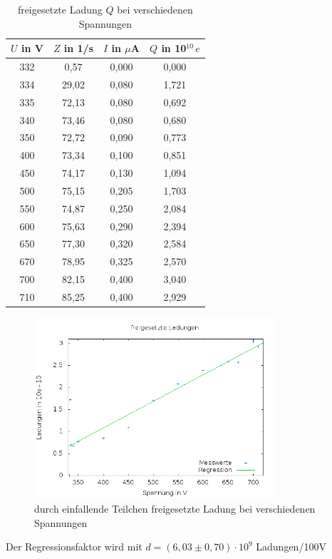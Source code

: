 \begin{table}[H]
\begin{tabular}{c|c|c|c}
$U$ in V & $Z$ in 1/s & $I$ in $\mu$A & $Q$ in 10$^{10}\,e$\\
\hline
332	&0,57&	0,000&	0,000\\
334&	29,02&	0,080&	1,721\\
335&	72,13&	0,080&	0,692\\
340&	73,46&	0,080&	0,680\\
350&	72,72&	0,090&	0,773\\
400&	73,34&	0,100&	0,851\\
450&	74,17&	0,130&	1,094\\
500&	75,15&	0,205&	1,703\\
550&	74,87&	0,250&	2,084\\
600&	75,63&	0,290&	2,394\\
650&	77,30&	0,320&	2,584\\
670&	78,95&	0,325&	2,570\\
700&	82,15&	0,400&	3,040\\
710&	85,25&	0,400&	2,929 \\

\end{tabular}
\caption{freigesetzte Ladung $Q$ bei verschiedenen Spannungen}
\label{tab_ladungsmenge}
\end{table}

\begin{figure}[H]
 \includegraphics[width=0.8\textwidth]{pics/ladungen.png}
 \caption{durch einfallende Teilchen freigesetzte Ladung bei verschiedenen Spannungen}
 \label{pic_ladung}
\end{figure}
Der Regressionsfaktor wird mit $d = (6,03 \pm 0,70)\cdot 10^{9}$ Ladungen/100V

